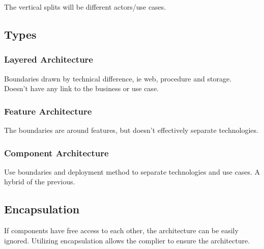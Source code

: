 \documentclass[11pt]{scrartcl} %
\begin{document}
The vertical splits will be different actors/use cases.

\subsection{Types}

\subsubsection{Layered Architecture}

Boundaries drawn by technical difference, ie web, procedure and storage.\\

Doesn't have any link to the business or use case.

\subsubsection{Feature Architecture}

The boundaries are around features, but doesn't effectively separate technologies.

\subsubsection{Component Architecture}

Use boundaries and deployment method to separate technologies and use cases. A hybrid of the previous.

\subsection{Encapsulation}

If components have free access to each other, the architecture can be easily ignored. Utilizing
encapsulation allows the complier to ensure the architecture.



\end{document}
